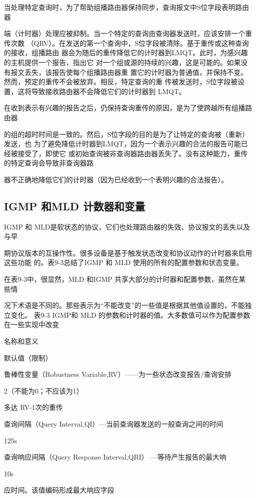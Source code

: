 当处理特定查询时，为了帮助组播路由器保持同步，查询报文中S位字段表明路由器

端（计时器）处理应被抑制。当一个特定的查询由查询器发送时，应该安排一个重传次数
（QRV）。在发送的第一个查询中，S位字段被清除。基于重传或这种查询的接收，组播路由
器会为随后的重传降低它的计时器到LMQT。此时，为感兴趣的主机提供一个报告，指出它
对一个组或源的持续的兴趣，这是可能的。如果没有报文丢失，该报告使每个组播路由器重
置它的计时器为普通值，并保持不变。然而，预定的重传不会被放弃。相反，特定查询的重
传被发送时，S位字段被设置，这将导致接收路由器不会降低它们的计时器到 LMQT。

在收到表示有兴趣的报告之后，仍保持查询重传的原因，是为了使跨越所有组播路由器

的组的超时时间是一致的。然后，S位字段的目的是为了让特定的查询被（重新）发送，也
为了避免降低计时器到LMQT，因为一个表示兴趣的合法的报告可能已经被接受了，即使它
或初始查询被非查询器路由器丢失了。没有这种能力，重传的特定查询会导致非查询器路

器不正确地降低它们的计时器（因为已经收到一个表明兴趣的合法报告）。

\subsection{IGMP 和MLD 计数器和变量}
IGMP 和 MLD是软状态的协议，它们也处理路由器的失效、协议报文的丢失以及与早

期协议版本的互操作性。很多设备是基于触发状态改变和协议动作的计时器来启用这些功能
的。表9-3总结了IGMP 和 MLD 使用的所有的配置参数和状态变量。

在表9-3中，很显然，MLD 和IGMP 共享大部分的计时器和配置参数，虽然在某些情

况下术语是不同的。那些表示为“不能改变”的一些值是根据其他值设置的，不能独立变化。
表9-3 IGMP和 MLD 的参数和计时器的值。大多数值可以作为配置参数在一些实现中改变

名称和意义

默认值（限制）

鲁棒性变量（Robustness Variable,RV）——为一些状态改变报告/查询安排

2（不能为0；不应该为1）

多达 RV-1次的重传

查询间隔（Query Interval,QI）—当前查询器发送的一般查询之间的时间

125s

查询响应间隔（Query Response Interval,QRI） —等待产生报告的最大响

10s

应时间。该值编码形成最大响应字段

